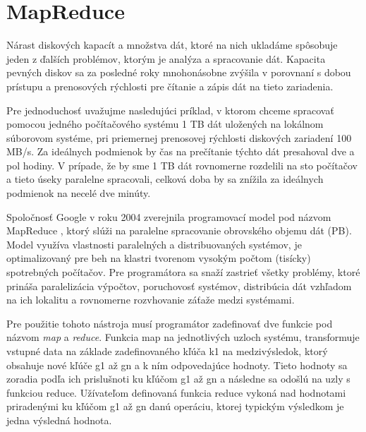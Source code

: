\documentclass[11pt,twoside,a4paper]{book}
\begin{document}

\section{MapReduce}

Nárast diskových kapacít a množstva dát, ktoré na nich ukladáme spôsobuje jeden z ďalších problémov, ktorým je analýza a spracovanie dát. Kapacita pevných diskov sa za posledné roky mnohonásobne zvýšila v porovnaní s dobou prístupu a prenosových rýchlosti pre čítanie a zápis dát na tieto zariadenia.

Pre jednoduchosť uvažujme nasledujúci príklad, v ktorom chceme spracovať pomocou jedného počítačového systému 1 TB dát uložených na lokálnom súborovom systéme, pri priemernej prenosovej rýchlosti diskových zariadení 100 MB/s. Za ideálnych podmienok by čas na prečítanie týchto dát presahoval dve a pol hodiny. V prípade, že by sme 1 TB dát rovnomerne rozdelili na sto počítačov a tieto úseky paralelne spracovali, celková doba by sa znížila za ideálnych podmienok na necelé dve minúty. 

Spoločnosť Google v roku 2004 zverejnila programovací model pod názvom MapReduce \cite{dean2008mapreduce}, ktorý slúži na paralelne spracovanie obrovského objemu dát (PB). Model využíva vlastnosti paralelných a distribuovaných systémov, je optimalizovaný pre beh na klastri tvorenom vysokým počtom (tisícky) spotrebných počítačov. Pre programátora sa snaží zastrieť všetky problémy, ktoré prináša paralelizácia výpočtov, poruchovosť systémov, distribúcia dát vzhľadom na ich lokalitu a rovnomerne rozvhovanie záťaže medzi systémami.

Pre použitie tohoto nástroja musí programátor zadefinovať dve funkcie pod názvom \emph{map} a \emph{reduce}. Funkcia map na jednotlivých uzloch systému, transformuje vstupné data na základe zadefinovaného kľúča k1 na medzivýsledok, ktorý obsahuje nové kľúče g1 až gn a k ním odpovedajúce hodnoty. Tieto hodnoty sa zoradia podľa ich prislušnoti ku kľúčom g1 až gn a následne sa odošlú na uzly s funkciou reduce. Užívateľom definovaná funkcia reduce vykoná nad hodnotami priradenými ku kľúčom g1 až gn danú operáciu, ktorej typickým výsledkom je jedna výsledná hodnota.
\end{document}
